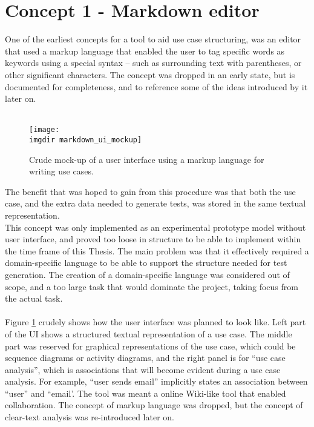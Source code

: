 \section{Concept 1 - Markdown editor}
One of the earliest concepts for a tool to aid use case structuring, was an editor that used a markup language that enabled the user to tag specific words as keywords using a special syntax -- such as surrounding text with parentheses, or other significant characters. The concept was dropped in an early state, but is documented for completeness, and to reference some of the ideas introduced by it later on.\\\\
\begin{figure}[!htbp]
  \centering
  \texttt{[image: \\imgdir markdown\_ui\_mockup]}
  \caption{Crude mock-up of a user interface using a markup language for writing use cases.}
\label{fig:markdown_ui_mockup}
\end{figure}The benefit that was hoped to gain from this procedure was that both the use case, and the extra data needed to generate tests, was stored in the same textual representation.\\
This concept was only implemented as an experimental prototype model without user interface, and proved too loose in structure to be able to implement within the time frame of this Thesis. The main problem was that it effectively required a domain-specific language to be able to support the structure needed for test generation. The creation of a domain-specific language was considered out of scope, and a too large task that would dominate the project, taking focus from the actual task.\\\\
Figure \ref{fig:markdown_ui_mockup} crudely shows how the user interface was planned to look like. Left part of the UI shows a structured textual representation of a use case. The middle part was reserved for graphical representations of the use case, which could be sequence diagrams or activity diagrams, and the right panel is for ``use case analysis'', which is associations that will become evident during a use case analysis. For example, ``user sends email'' implicitly states an association between ``user'' and ``email'. The tool was meant a online Wiki-like tool that enabled collaboration. The concept of markup language was dropped, but the concept of clear-text analysis was re-introduced later on.

